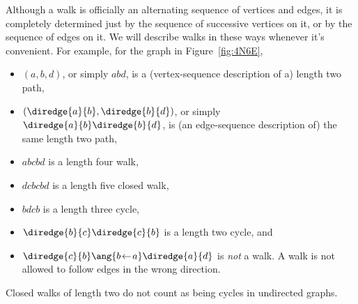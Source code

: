 Although a walk is officially an alternating sequence of vertices and
edges, it is completely determined just by the sequence of successive
vertices on it, or by the sequence of edges on it.  We will
describe walks in these ways whenever it's convenient.  For example,
for the graph in Figure~\ref{fig:4N6E},
\begin{itemize}

\item $(a, b, d)$, or simply $abd$, is a (vertex-sequence description
  of a) length two path,

\item $(\diredge{a}{b}, \diredge{b}{d})$, or simply
  $\diredge{a}{b}\diredge{b}{d}$, is (an edge-sequence description of)
  the same length two path,

\item $abcbd$ is a length four walk,

\item $dcbcbd$ is a length five closed walk,

\item $bdcb$ is a length three cycle,

\item $\diredge{b}{c}\diredge{c}{b}$ is a length two cycle, and

\item $\diredge{c}{b}\ang{b\! \leftarrow\! a}\diredge{a}{d}$
  is \emph{not} a walk.  A walk is not allowed to follow
  edges in the wrong direction.
\end{itemize}


\begin{editingnotes}
Closed walks of length two do not count as being cycles in undirected
graphs.
\end{editingnotes}

